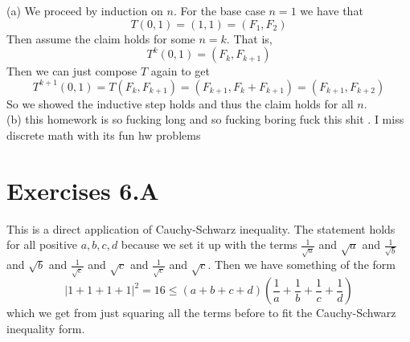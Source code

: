\documentclass[10pt, twocolumn]{article}
\begin{document}
\begin{q}[16]
    (a)
    We proceed by induction on $ n $. For the base case $ n = 1 $ we have that 
    $$ T(0, 1) = (1, 1) = (F_1, F_2) $$
    Then assume the claim holds for some $ n = k $. That is, 
    $$ T^k(0, 1) = (F_k, F_{k + 1}) $$
    Then we can just compose $ T $ again to get
    $$ T^{k+1}(0, 1) = T(F_k, F_{k + 1}) = (F_{k + 1}, F_k + F_{k + 1}) = (F_{k + 1}, F_{k + 2})$$
    So we showed the inductive step holds and thus the claim holds for all $ n $. \\
    (b) this homework is so fucking long and so fucking boring fuck this shit . I miss discrete math with its fun hw problems
\end{q}

\section{Exercises 6.A}
\begin{q}[11]
    This is a direct application of Cauchy-Schwarz inequality. 
    The statement holds for all positive $ a, b, c, d $ because we set it up with the terms 
    $ \frac{1}{\sqrt{a}} $ and $ \sqrt{a} $ and 
    $ \frac{1}{\sqrt{b}} $ and $ \sqrt{b} $ and 
    $ \frac{1}{\sqrt{c}} $ and $ \sqrt{c} $ and 
    $ \frac{1}{\sqrt{c}} $ and $ \sqrt{c} $. 
    Then we have something of the form
    $$ | 1 + 1 + 1 + 1 |^2 = 16 \leq (a+b+c+d)\left(\frac{1}{a}+\frac{1}{b}+\frac{1}{c}+\frac{1}{d}\right)$$
    which we get from just squaring all the terms before to fit the Cauchy-Schwarz inequality form.
\end{q}
\end{document}
